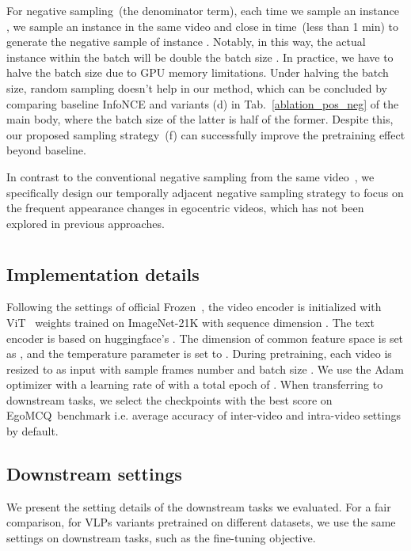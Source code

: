 \documentclass{article}
\newcommand{\eval}{EgoMCQ}
\begin{document}
For negative sampling~(the denominator term), each time we sample an instance , we sample an instance  in the same video and close in time~(less than 1 min) to generate the negative sample  of instance .
Notably, in this way, the actual instance within the batch  will be double the batch size .
In practice, we have to halve the batch size due to GPU memory limitations. 
Under halving the batch size, random sampling doesn't help in our method, which can be concluded by comparing baseline InfoNCE and variants (d) in Tab.~\ref{ablation_pos_neg} of the main body, where the batch size of the latter is half of the former. Despite this, our proposed sampling strategy~(f) can successfully improve the pretraining effect beyond baseline.

In contrast to the conventional negative sampling from the same video~\cite{wray2021semantic, lei2021detecting}, 
we specifically design our temporally adjacent negative sampling strategy to focus on the frequent appearance changes in egocentric videos, which has not been explored in previous approaches. \section{\secd}\label{d}
\subsection{Implementation details}
Following the settings of official Frozen~\cite{bain2021frozen}, the video encoder is initialized with ViT~\cite{dosovitskiy2020image} weights trained on ImageNet-21K with sequence dimension . 
The text encoder is based on huggingface's .
The dimension of common feature space is set as , and the temperature parameter is set to .
During pretraining, each video is resized to  as input with sample frames number  and batch size .
We use the Adam optimizer with a learning rate of  with a total epoch of . When transferring to downstream tasks, we select the checkpoints with the best score on \eval~benchmark i.e. average accuracy of inter-video and intra-video settings by default.

\subsection{Downstream settings}
We present the setting details of the downstream tasks we evaluated. 
For a fair comparison, for VLPs variants pretrained on different datasets, we use the same settings on downstream tasks, such as the fine-tuning objective.
\end{document}
